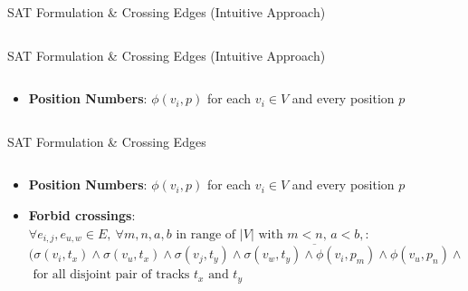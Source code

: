 \documentclass[hyperref={pdfpagelabels=false},aspectratio=169]{beamer}
\theoremstyle{definition}
\begin{document}
\begin{frame}{SAT Formulation \& Crossing Edges (Intuitive Approach)}
    \begin{columns}
        \begin{column}{1\textwidth}
        \end{column}
    \end{columns}
\end{frame}

\begin{frame}{SAT Formulation \& Crossing Edges (Intuitive Approach)}
    \begin{columns}
        \begin{column}{1\textwidth}
            \begin{itemize}
                \item \textbf{Position Numbers}: $\phi(v_i,p)$ for each $v_i \in V$ and every position $p$
            \end{itemize}
        \end{column}
    \end{columns}
\end{frame}

\begin{frame}{SAT Formulation \& Crossing Edges}
    \begin{columns}
        \begin{column}{1\textwidth}
            \begin{itemize}
                \item \textbf{Position Numbers}: $\phi(v_i,p)$ for each $v_i \in V$ and every position $p$
                \item \textbf{Forbid crossings}: $ \forall e_{i,j}, e_{u,w} \in E, \ \forall m,n,a,b \text{ in range of } \vert V \vert \text{ with } m<n, \, a<b,:$
                \newline
                \newline
                $(\overline{\sigma(v_i,t_x) \land \sigma(v_u,t_x) \land \sigma(v_j,t_y) \land \sigma(v_w,t_y) \land \phi(v_i,p_m) \land \phi(v_u,p_n) \land \phi(v_w,p_a) \land \phi(v_j,p_b)}$
                \newline
                \newline
                $\text{ for all disjoint pair of tracks } t_x \text{ and } t_y $
            \end{itemize}
        \end{column}
    \end{columns}
\end{frame}
\end{document}
